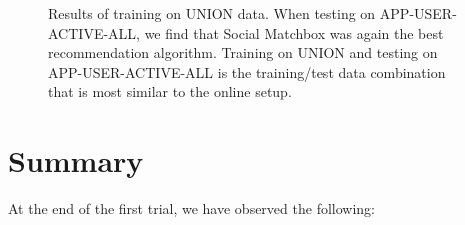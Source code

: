 \begin{figure}[t!]
\caption{Results of training on UNION data. When testing on APP-USER-ACTIVE-ALL, we find that Social Matchbox was again the best recommendation algorithm. Training on UNION and testing on APP-USER-ACTIVE-ALL is the training/test data combination that is most similar to the online setup.}
\label{fig:union1}
\end{figure}

\section{Summary}
At the end of the first trial, we have observed the following:

